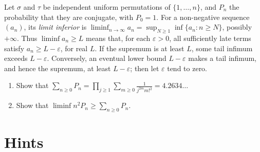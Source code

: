 \begin{exercise}[$\star\star\star$]\label{pb:conjugate}
Let $\sigma$ and $\tau$ be independent uniform permutations of $\{1,\dots,n\}$, and $P_n$ the probability that they are
conjugate, with $P_0=1$.
For a non-negative sequence $(a_n)$, its \emph{limit inferior} is
$\liminf_{n\to\infty}a_n=\sup_{N\ge1}\inf\{a_n:n\ge N\}$,
possibly $+\infty$. Thus $\liminf a_n\ge L$ means that, for each $\varepsilon>0$,
all sufficiently late terms satisfy $a_n\ge L-\varepsilon$, for real $L$.
If the supremum is at least $L$, some tail infimum exceeds $L-\varepsilon$.
Conversely, an eventual lower bound $L-\varepsilon$ makes a tail infimum,
and hence the supremum, at least $L-\varepsilon$; then let $\varepsilon$ tend to zero.
\begin{enumerate}[label=(\alph*)]
\item Show that $\sum_{n\ge0}P_n=\prod_{j\ge1}\sum_{m\ge0}\frac1{j^{2m}m!^2}=4.2634\ldots$
\item Show that $\liminf n^2P_n\ge\sum_{n\ge0}P_n$.
\end{enumerate}
\end{exercise}

\section{Hints}

